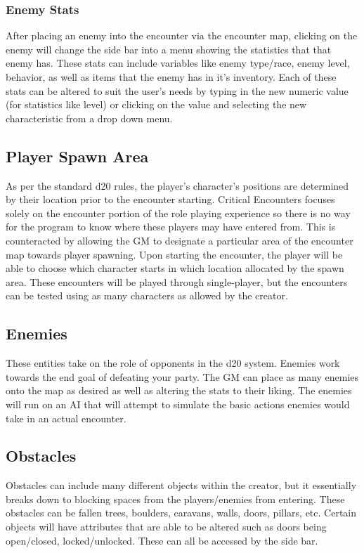 \documentclass[12pt,a4paper]{report}
\begin{document}
			\subsubsection{Enemy Stats}
			After placing an enemy into the encounter via the encounter map, clicking on the enemy will change the side bar into a menu showing the statistics that that enemy has. These stats can include variables like enemy type/race, enemy level, behavior, as well as items that the enemy has in it's inventory. Each of these stats can be altered to suit the user's needs by typing in the new numeric value (for statistics like level) or clicking on the value and selecting the new characteristic from a drop down menu. 
		\subsection{Player Spawn Area}
		As per the standard d20 rules, the player's character's positions are determined by their location prior to the encounter starting. Critical Encounters focuses solely on the encounter portion of the role playing experience so there is no way for the program to know where these players may have entered from. This is counteracted by allowing the GM to designate a particular area of the encounter map towards player spawning. Upon starting the encounter, the player will be able to choose which character starts in which location allocated by the spawn area. These encounters will be played through single-player, but the encounters can be tested using as many characters as allowed by the creator.
		\subsection{Enemies}
		These entities take on the role of opponents in the d20 system. Enemies work towards the end goal of defeating your party. The GM can place as many enemies onto the map as desired as well as altering the stats to their liking. The enemies will run on an AI that will attempt to simulate the basic actions enemies would take in an actual encounter.
		\subsection{Obstacles}
		Obstacles can include many different objects within the creator, but it essentially breaks down to blocking spaces from the players/enemies from entering. These obstacles can be fallen trees, boulders, caravans, walls, doors, pillars, etc. Certain objects will have attributes that are able to be altered such as doors being open/closed, locked/unlocked. These can all be accessed by the side bar.
\end{document}
